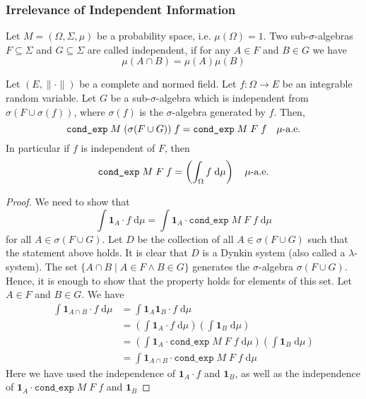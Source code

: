 \subsubsection{Irrelevance of Independent Information}

Let $M = (\Omega, \Sigma, \mu)$ be a probability space, i.e. $\mu(\Omega) = 1$. Two sub-$\sigma$-algebras $F \subseteq \Sigma$ and $G \subseteq \Sigma$ are called independent, if for any $A \in F$ and $B \in G$ we have
\[
	\mu(A \cap B) = \mu(A) \mu(B)
\]
\begin{lemma}
Let $(E, \lVert \cdot\rVert)$ be a complete and normed field. Let $f : \Omega \rightarrow E$ be an integrable random variable. Let $G$ be a sub-$\sigma$-algebra which is independent from $\sigma(F \cup \sigma(f))$, where $\sigma(f)$ is the $\sigma$-algebra generated by $f$. Then,
\[
	\normalfont \texttt{cond\_exp} \; M \; (\sigma(F \cup G)) \; f = \texttt{cond\_exp} \; M \; F \; f \quad \mu\textrm{-a.e.}
\]
In particular if $f$ is independent of $F$, then 
\[
	\normalfont \texttt{cond\_exp} \; M \; F \; f = \left(\int_\Omega f \; \textrm{d} \mu\right) \quad \mu\textrm{-a.e.}
\]
\end{lemma}
\begin{proof}
	We need to show that
	\[
		\int \mathbf{1}_A \cdot f \; \textrm{d} \mu = \int \mathbf{1}_A \cdot \texttt{cond\_exp} \; M \; F \; f \; \textrm{d} \mu
	\]
	for all $A \in \sigma(F \cup G)$. Let $D$ be the collection of all $A \in \sigma(F \cup G)$ such that the statement above holds. It is clear that $D$ is a Dynkin system (also called a $\lambda$-system). The set $\{A \cap B \;\vert\; A \in F \wedge B \in G\}$ generates the $\sigma$-algebra $\sigma(F \cup G)$. Hence, it is enough to show that the property holds for elements of this set. Let $A \in F$ and $B \in G$. We have
\begin{align*}
	\int \mathbf{1}_{A \cap B} \cdot f \; \textrm{d} \mu &= \int \mathbf{1}_A \mathbf{1}_B \cdot f \; \textrm{d} \mu \\
	&= \left(\int \mathbf{1}_A \cdot f \; \textrm{d} \mu\right) \left(\int \mathbf{1}_B\; \textrm{d} \mu \right) \\
	&= \left(\int \mathbf{1}_A \cdot \texttt{cond\_exp} \; M \; F \; f \; \textrm{d} \mu \right) \left(\int \mathbf{1}_B\; \textrm{d} \mu \right) \\
	&= \int \mathbf{1}_{A \cap B} \cdot \texttt{cond\_exp} \; M \; F \; f \; \textrm{d} \mu
\end{align*}
Here we have used the independence of $\mathbf{1}_A \cdot f$ and $\mathbf{1}_B$, as well as the independence of $\mathbf{1}_A \cdot \texttt{cond\_exp} \; M \; F \; f$ and $\mathbf{1}_B$
\end{proof}

